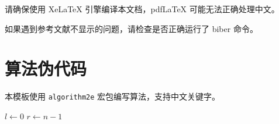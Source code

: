 \begin{warnbox}
    请确保使用 XeLaTeX 引擎编译本文档，pdfLaTeX 可能无法正确处理中文。
\end{warnbox}

\begin{notebox}
    如果遇到参考文献不显示的问题，请检查是否正确运行了 biber 命令。
\end{notebox}

\section{算法伪代码}

本模板使用 \texttt{algorithm2e} 宏包编写算法，支持中文关键字。

\begin{algorithm}[H]
    \caption{二分查找}
    \label{alg:binary-search}
    $l \leftarrow 0$\;
    $r \leftarrow n - 1$\;
    \;
\end{algorithm}

\vspace{1em}

\begin{algorithm}[H]
    \caption{快速排序}
    \label{alg:quicksort}
\end{algorithm}
